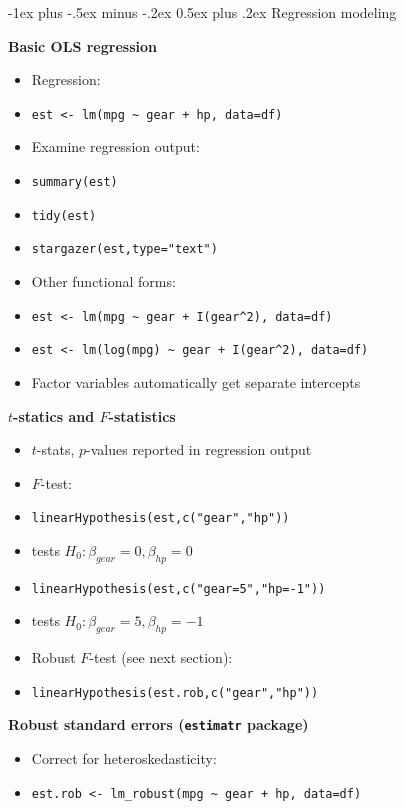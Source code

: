 \documentclass[10pt,landscape]{article}
\makeatletter
\renewcommand{\section}{\@startsection{section}{1}{0mm}%
                                {-1ex plus -.5ex minus -.2ex}%
                                {0.5ex plus .2ex}%
                                {\normalfont\large\bfseries}}
\makeatother
\begin{document}
\begin{multicols}{3}
\section{Regression modeling}

\smallskip{}

\textbf{Basic OLS regression}\\
\begin{itemize}
    \item Regression:
    \item[] \verb!est <- lm(mpg ~ gear + hp, data=df)!
    \item Examine regression output:
    \item[] \verb!summary(est)!
    \item[] \verb!tidy(est)!
    \item[] \verb!stargazer(est,type="text")!
    \item Other functional forms:
    \item[] \verb!est <- lm(mpg ~ gear + I(gear^2), data=df)!
    \item[] \verb!est <- lm(log(mpg) ~ gear + I(gear^2), data=df)!
    \item Factor variables automatically get separate intercepts
\end{itemize}

\smallskip{}

\textbf{$t$-statics and $F$-statistics}\\
\begin{itemize}
    \item $t$-stats, $p$-values reported in regression output
    \item $F$-test:
    \item[] \verb!linearHypothesis(est,c("gear","hp"))!
    \item[] tests $H_0: \beta_{gear} = 0, \beta_{hp}=0$
    \item[] \verb!linearHypothesis(est,c("gear=5","hp=-1"))!
    \item[] tests $H_0: \beta_{gear} = 5, \beta_{hp}=-1$
    \item Robust $F$-test (see next section):
    \item[] \verb!linearHypothesis(est.rob,c("gear","hp"))!
\end{itemize}

\smallskip{}

\textbf{Robust standard errors (\texttt{estimatr} package)}\\
\begin{itemize}
    \item Correct for heteroskedasticity:
    \item[] \verb!est.rob <- lm_robust(mpg ~ gear + hp, data=df)!
    

\end{itemize}
\end{multicols}
\end{document}
